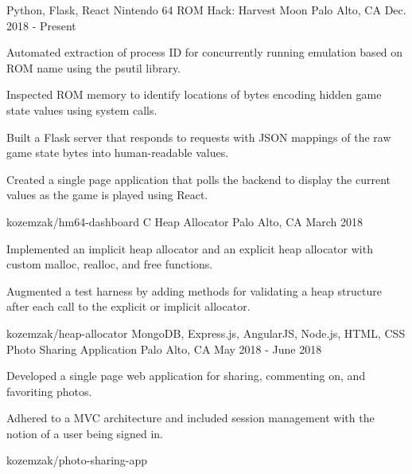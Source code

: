 
\begin{cventries}
  \cvprojectentry
    {Python, Flask, React}
    {Nintendo 64 ROM Hack: Harvest Moon}
    {Palo Alto, CA}
    {Dec. 2018 - Present}
    {
      \begin{cvitems}
        \item{Automated extraction of process ID for concurrently running emulation based on ROM name using the psutil library.}
        \item{Inspected ROM memory to identify locations of bytes encoding hidden game state values using system calls.}
        \item{Built a Flask server that responds to requests with JSON mappings of the raw game state bytes into human-readable values.}
        \item{Created a single page application that polls the backend to display the current values as the game is played using React.}
      \end{cvitems} 
    }
    {kozemzak/hm64-dashboard}
  \cvprojectentry
    {C}
    {Heap Allocator}
    {Palo Alto, CA}
    {March 2018}
    {
      \begin{cvitems}
        \item {Implemented an implicit heap allocator and an explicit heap allocator with custom malloc, realloc, and free functions.}
        \item {Augmented a test harness by adding methods for validating a heap structure after each call to the explicit or implicit allocator.}
      \end{cvitems}
    }
    {kozemzak/heap-allocator}
  \cvprojectentry
    {MongoDB, Express.js, AngularJS, Node.js, HTML, CSS}
    {Photo Sharing Application}
    {Palo Alto, CA}
    {May 2018 - June 2018}
    {
      \begin{cvitems}
        \item {Developed a single page web application for sharing, commenting on, and favoriting photos.}
        \item {Adhered to a MVC architecture and included session management with the notion of a user being signed in.}
      \end{cvitems} 
    }
    {kozemzak/photo-sharing-app}
\end{cventries}